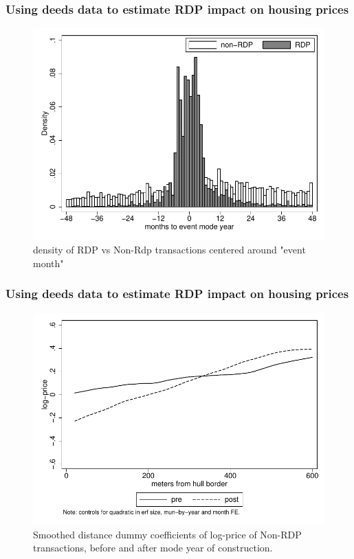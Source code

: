 \documentclass[aspectratio=149]{beamer}
\begin{document}
\begin{frame}
\frametitle{Using deeds data to estimate RDP impact on housing prices}

\begin{center}
\begin{figure}
\includegraphics[scale=0.65]{summary_densitytime.pdf}
\vspace{-3mm}
\caption{density of RDP vs Non-Rdp transactions centered around "event month"}
\end{figure}
\end{center}


\end{frame}


\begin{frame}
\frametitle{Using deeds data to estimate RDP impact on housing prices}

\begin{center}
\begin{figure}
\includegraphics[scale=0.65]{reg_pm1.pdf}
\vspace{-3mm}
\caption{Smoothed distance dummy coefficients of log-price of Non-RDP transactions, before and after mode year of construction.}
\end{figure}
\end{center}


\end{frame}
\end{document}
